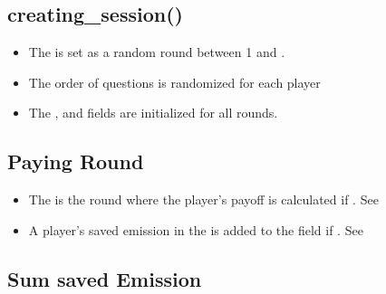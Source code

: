 \documentclass[letterpaper,10pt,english]{sphinxmanual}
\begin{document}
\subsection{creating\_session()}
\label{\detokenize{Subsession_fields:creating-session}}\label{\detokenize{Subsession_fields:creating-session-ref}}\begin{itemize}
\item {} 
The  is set as a random round between 1 and .

\item {} 
The order of questions is randomized for each player

\item {} 
The ,  and  fields are initialized for all rounds.

\end{itemize}


\subsection{Paying Round}
\label{\detokenize{Subsession_fields:paying-round}}\label{\detokenize{Subsession_fields:paying-round-ref}}\begin{itemize}
\item {} 
The  is the round where the player’s payoff is calculated if . See {\hyperref[\detokenize{Constants:random-payoff}]{}}

\item {} 
A player’s saved emission in the  is added to the  field if . See {\hyperref[\detokenize{Constants:random-emission}]{}}

\end{itemize}


\subsection{Sum saved Emission}
\label{\detokenize{Subsession_fields:sum-saved-emission}}\label{\detokenize{Subsession_fields:sum-saved-emission-ref}}
\end{document}
